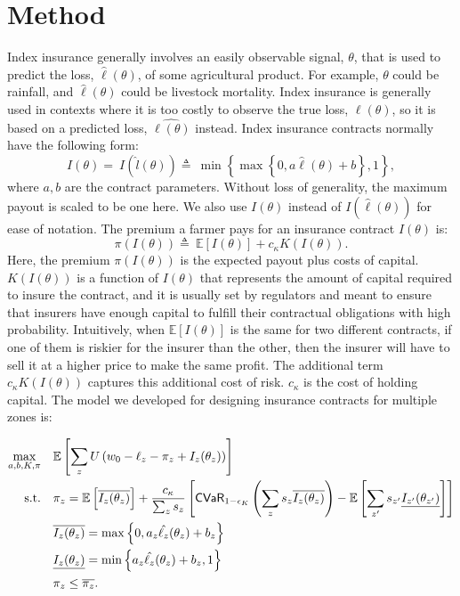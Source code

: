 \documentclass[12pt]{article}
\begin{document}
\section{Method}
Index insurance generally involves an easily observable signal, $\theta$, that is used to predict the loss, $\hat{\ell}(\theta)$, of some agricultural product. For example, $\theta$ could be rainfall, and $\hat{\ell}(\theta)$ could be livestock mortality. Index insurance is generally used in contexts where it is too costly to observe the true loss, $\ell(\theta)$, so it is based on a predicted loss, $\hat{\ell(\theta)}$ instead. Index insurance contracts normally have the following form: 
\begin{equation}
   I(\theta)=\ I(\hat{l}(\theta)) \triangleq\ \min \left \{\max \left \{0,a\hat{\ell}(\theta) + b \right \}, 1 \right \}, 
\end{equation}
where $a,b$ are the contract parameters. Without loss of generality, the maximum payout is scaled to be one here. We also use $I(\theta)$ instead of $I(\hat{\ell}(\theta))$ for ease of notation. The premium a farmer pays for an insurance contract $I(\theta)$ is:%
\begin{equation}\label{eq-02}
   \pi(I(\theta)) \triangleq\ \mathbb{E}[I(\theta)] + c_{\kappa} K(I(\theta)).
\end{equation}
Here, the premium $\pi(I(\theta))$ is the expected payout plus costs of capital. $K(I(\theta))$ is a function of $I(\theta)$ that represents the amount of capital required to insure the contract, and it is usually set by regulators and meant to ensure that insurers have enough capital to fulfill their contractual obligations with high probability. Intuitively, when $\mathbb{E}[I(\theta)]$ is the same for two different contracts, if one of them is riskier for the insurer than the other, then the insurer will have to sell it at a higher price to make the same profit. The additional term $c_{\kappa} K(I(\theta))$ captures this additional cost of risk. $c_{\kappa}$ is the cost of holding capital. The model we developed for designing insurance contracts for multiple zones is: 

\begin{align}
  \max_{a,b,K,\pi} &\quad \mathbb{E} \left [ \sum_z U\left ( w_{0} -\ell_z -\pi_z + I_z(\theta_z) \right ) \right ]\label{eq-33}\\
    \text{s.t.} &\quad \pi_z  = \mathbb{E}\left [ \overline{I_z(\theta_z)} \right ] + \frac{c_{\kappa}}{\sum_z s_z}  \left [ {\sf CVaR}_{1-\epsilon_K} \left ( \sum_z s_z\overline{I_z(\theta_z)} \right ) - \mathbb{E}\left [ \sum_{z'} s_{z'}\underline{I_{z'}(\theta_{z'})} \right ] \right ] \label{eq-32}\\
    &\quad \overline{I_z(\theta_z)} = \max \left \{0,a_z\hat{\ell_z}(\theta_z) + b_z \right \} \nonumber\\
    &\quad\underline{I_z(\theta_z)} = \min \left \{a_z\hat{\ell_z}(\theta_z)+b_z,1 \right \} \nonumber\\
    &\quad\pi_z \leq \overline{\pi_z} \nonumber.
  \end{align}
\end{document}
